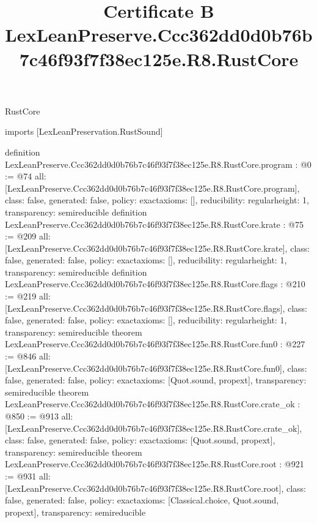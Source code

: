 \begin{lexlean}{RustCore}
\title{Certificate B LexLeanPreserve.Ccc362dd0d0b76b7c46f93f7f38ec125e.R8.RustCore}
\begin{coremodule}
imports [LexLeanPreservation.RustSound]

definition LexLeanPreserve.Ccc362dd0d0b76b7c46f93f7f38ec125e.R8.RustCore.program : @0 := @74 {
  all: [LexLeanPreserve.Ccc362dd0d0b76b7c46f93f7f38ec125e.R8.RustCore.program],
  class: false,
  generated: false,
  policy: exact{axioms: []},
  reducibility: regular{height: 1},
  transparency: semireducible
}
definition LexLeanPreserve.Ccc362dd0d0b76b7c46f93f7f38ec125e.R8.RustCore.krate : @75 := @209 {
  all: [LexLeanPreserve.Ccc362dd0d0b76b7c46f93f7f38ec125e.R8.RustCore.krate],
  class: false,
  generated: false,
  policy: exact{axioms: []},
  reducibility: regular{height: 1},
  transparency: semireducible
}
definition LexLeanPreserve.Ccc362dd0d0b76b7c46f93f7f38ec125e.R8.RustCore.flags : @210 := @219 {
  all: [LexLeanPreserve.Ccc362dd0d0b76b7c46f93f7f38ec125e.R8.RustCore.flags],
  class: false,
  generated: false,
  policy: exact{axioms: []},
  reducibility: regular{height: 1},
  transparency: semireducible
}
theorem LexLeanPreserve.Ccc362dd0d0b76b7c46f93f7f38ec125e.R8.RustCore.fun0 : @227 := @846 {
  all: [LexLeanPreserve.Ccc362dd0d0b76b7c46f93f7f38ec125e.R8.RustCore.fun0],
  class: false,
  generated: false,
  policy: exact{axioms: [Quot.sound, propext]},
  transparency: semireducible
}
theorem LexLeanPreserve.Ccc362dd0d0b76b7c46f93f7f38ec125e.R8.RustCore.crate_ok : @850 := @913 {
  all: [LexLeanPreserve.Ccc362dd0d0b76b7c46f93f7f38ec125e.R8.RustCore.crate_ok],
  class: false,
  generated: false,
  policy: exact{axioms: [Quot.sound, propext]},
  transparency: semireducible
}
theorem LexLeanPreserve.Ccc362dd0d0b76b7c46f93f7f38ec125e.R8.RustCore.root : @921 := @931 {
  all: [LexLeanPreserve.Ccc362dd0d0b76b7c46f93f7f38ec125e.R8.RustCore.root],
  class: false,
  generated: false,
  policy: exact{axioms: [Classical.choice, Quot.sound, propext]},
  transparency: semireducible
}


\end{coremodule}
\end{lexlean}
